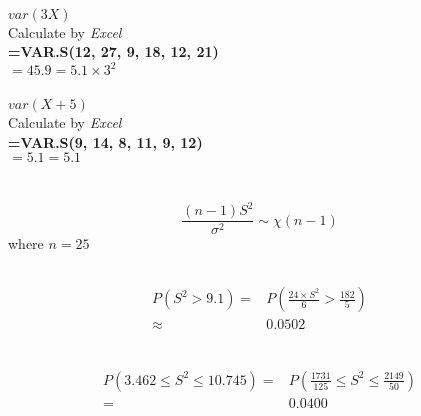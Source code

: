 \documentclass{article}
\begin{document}
            \paragraph{}
            $var(3X)$\\
            Calculate by \textit{Excel}\\
            \textbf{=VAR.S(12, 27, 9, 18, 12, 21)} \\$=45.9=5.1\times 3^2$\\
            \subsubsection{}
            \paragraph{}
            $var(X+5)$\\
            Calculate by \textit{Excel}\\
            \textbf{=VAR.S(9, 14, 8, 11, 9, 12)} \\$=5.1=5.1$\\
    \section{}
        \paragraph{}
        $$\frac{(n-1)S^2}{\sigma^2}\sim \chi(n-1)$$
        where $n=25$
        \subsection{}
            \paragraph{}
            \begin{equation*}
                \begin{split}
                    P(S^2>9.1)=&P(\frac{24\times S^2}{6}>\frac{182}{5})\\
                        \approx&0.0502\\
                \end{split}
            \end{equation*}
        \subsection{}
            \paragraph{}
            \begin{equation*}
                \begin{split}
                    P(3.462\leq S^2\leq 10.745)=&P(\frac{1731}{125}\leq S^2\leq\frac{2149}{50})\\
                        =&0.0400\\
                \end{split}
            \end{equation*}
\end{document}
